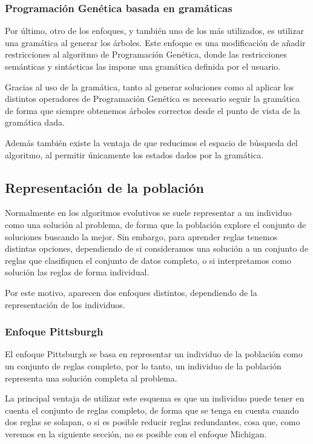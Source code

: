 \subsubsection{Programación Genética basada en gramáticas}

Por último, otro de los enfoques, y también uno de los más utilizados, es utilizar una gramática al generar los árboles. Este enfoque es una modificación de añadir restricciones al algoritmo de Programación Genética, donde las restricciones semánticas y sintácticas las impone una gramática definida por el usuario.

Gracias al uso de la gramática, tanto al generar soluciones como al aplicar los distintos operadores de Programación Genética es necesario seguir la gramática de forma que siempre obtenemos árboles correctos desde el punto de vista de la gramática dada.

Además también existe la ventaja de que reducimos el espacio de búsqueda del algoritmo, al permitir únicamente los estados dados por la gramática.


\subsection{Representación de la población}

Normalmente en los algoritmos evolutivos se suele representar a un individuo como una solución al problema, de forma que la población explore el conjunto de soluciones buscando la mejor. Sin embargo, para aprender reglas tenemos distintas opciones, dependiendo de si consideramos una solución a un conjunto de reglas que clasifiquen el conjunto de datos completo, o si interpretamos como solución las reglas de forma individual.

Por este motivo, aparecen dos enfoques distintos, dependiendo de la representación de los individuos.

\subsubsection{Enfoque Pittsburgh}

El enfoque Pittsburgh se basa en representar un individuo de la población como un conjunto de reglas completo, por lo tanto, un individuo de la población representa una solución completa al problema.

La principal ventaja de utilizar este esquema es que un individuo puede tener en cuenta el conjunto de reglas completo, de forma que se tenga en cuenta cuando dos reglas se solapan, o si es posible reducir reglas redundantes, cosa que, como veremos en la siguiente sección, no es posible con el enfoque Michigan.


